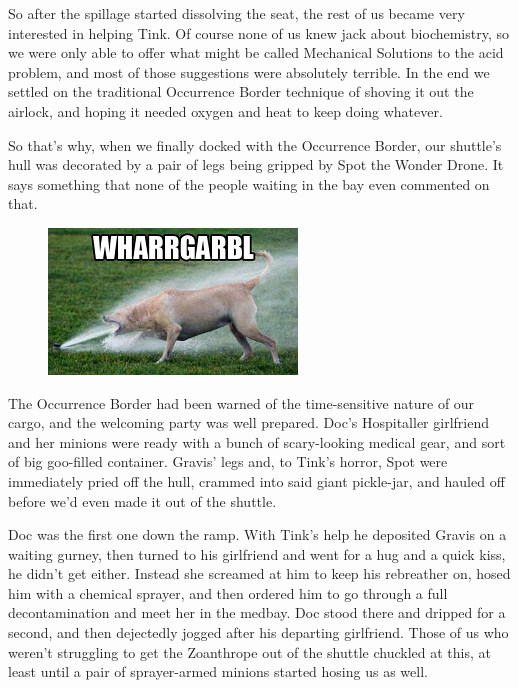 So after the spillage started dissolving the seat, the rest of us became very interested in helping Tink. 
Of course none of us knew jack about biochemistry, so we were only able to offer what might be called Mechanical Solutions to the acid problem, and most of those suggestions were absolutely terrible. 
In the end we settled on the traditional Occurrence Border technique of shoving it out the airlock, and hoping it needed oxygen and heat to keep doing whatever.

So that's why, when we finally docked with the Occurrence Border, our shuttle's hull was decorated by a pair of legs being gripped by Spot the Wonder Drone. 
It says something that none of the people waiting in the bay even commented on that.
\begin{figure}
	\begin{center}
		\includegraphics[width=\figwidth]{pics/12/62.png}
	\end{center}
\end{figure}
The Occurrence Border had been warned of the time-sensitive nature of our cargo, and the welcoming party was well prepared. 
Doc's Hospitaller girlfriend and her minions were ready with a bunch of scary-looking medical gear, and sort of big goo-filled container. 
Gravis' legs and, to Tink's horror, Spot were immediately pried off the hull, crammed into said giant pickle-jar, and hauled off before we'd even made it out of the shuttle.

Doc was the first one down the ramp. 
With Tink's help he deposited Gravis on a waiting gurney, then turned to his girlfriend and went for a hug and a quick kiss, he didn't get either. 
Instead she screamed at him to keep his rebreather on, hosed him with a chemical sprayer, and then ordered him to go through a full decontamination and meet her in the medbay. 
Doc stood there and dripped for a second, and then dejectedly jogged after his departing girlfriend. 
Those of us who weren't struggling to get the Zoanthrope out of the shuttle chuckled at this, at least until a pair of sprayer-armed minions started hosing us as well.

